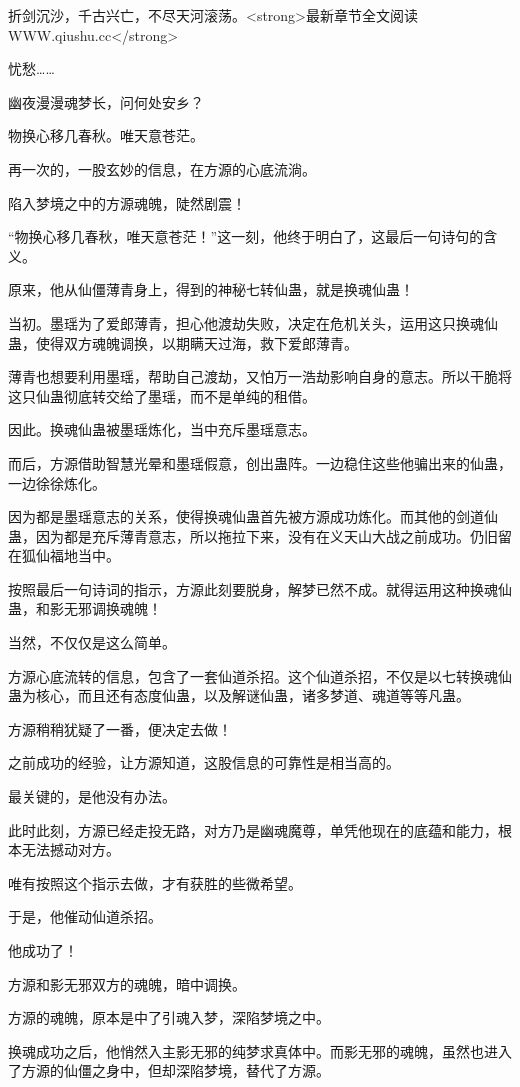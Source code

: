 \begin{this_body}
折剑沉沙，千古兴亡，不尽天河滚荡。<strong>最新章节全文阅读WWW.qiushu.cc</strong>

忧愁……

幽夜漫漫魂梦长，问何处安乡？

物换心移几春秋。唯天意苍茫。

再一次的，一股玄妙的信息，在方源的心底流淌。

陷入梦境之中的方源魂魄，陡然剧震！

“物换心移几春秋，唯天意苍茫！”这一刻，他终于明白了，这最后一句诗句的含义。

原来，他从仙僵薄青身上，得到的神秘七转仙蛊，就是换魂仙蛊！

当初。墨瑶为了爱郎薄青，担心他渡劫失败，决定在危机关头，运用这只换魂仙蛊，使得双方魂魄调换，以期瞒天过海，救下爱郎薄青。

薄青也想要利用墨瑶，帮助自己渡劫，又怕万一浩劫影响自身的意志。所以干脆将这只仙蛊彻底转交给了墨瑶，而不是单纯的租借。

因此。换魂仙蛊被墨瑶炼化，当中充斥墨瑶意志。

而后，方源借助智慧光晕和墨瑶假意，创出蛊阵。一边稳住这些他骗出来的仙蛊，一边徐徐炼化。

因为都是墨瑶意志的关系，使得换魂仙蛊首先被方源成功炼化。而其他的剑道仙蛊，因为都是充斥薄青意志，所以拖拉下来，没有在义天山大战之前成功。仍旧留在狐仙福地当中。

按照最后一句诗词的指示，方源此刻要脱身，解梦已然不成。就得运用这种换魂仙蛊，和影无邪调换魂魄！

当然，不仅仅是这么简单。

方源心底流转的信息，包含了一套仙道杀招。这个仙道杀招，不仅是以七转换魂仙蛊为核心，而且还有态度仙蛊，以及解谜仙蛊，诸多梦道、魂道等等凡蛊。

方源稍稍犹疑了一番，便决定去做！

之前成功的经验，让方源知道，这股信息的可靠性是相当高的。

最关键的，是他没有办法。

此时此刻，方源已经走投无路，对方乃是幽魂魔尊，单凭他现在的底蕴和能力，根本无法撼动对方。

唯有按照这个指示去做，才有获胜的些微希望。

于是，他催动仙道杀招。

他成功了！

方源和影无邪双方的魂魄，暗中调换。

方源的魂魄，原本是中了引魂入梦，深陷梦境之中。

换魂成功之后，他悄然入主影无邪的纯梦求真体中。而影无邪的魂魄，虽然也进入了方源的仙僵之身中，但却深陷梦境，替代了方源。


\end{this_body}
